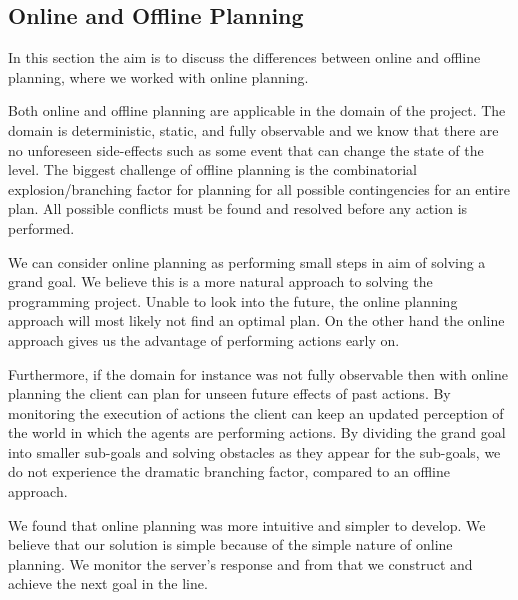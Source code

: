 \subsection{Online and Offline Planning}

In this section the aim is to discuss the differences between online and offline planning, where we worked with online planning.

Both online and offline planning are applicable in the domain of the project.
The domain is deterministic, static, and fully observable and we know that there are no unforeseen side-effects such as some event that can change the state of the level.
The biggest challenge of offline planning is the combinatorial explosion/branching factor for planning for all possible contingencies for an entire plan.
All possible conflicts must be found and resolved before any action is performed.

We can consider online planning as performing small steps in aim of solving a grand goal.
We believe this is a more natural approach to solving the programming project.
Unable to look into the future, the online planning approach will most likely not find an optimal plan.
On the other hand the online approach gives us the advantage of performing actions early on.

Furthermore, if the domain for instance was not fully observable then with online planning the client can plan for unseen future effects of past actions.
By monitoring the execution of actions the client can keep an updated perception of the world in which the agents are performing actions.
By dividing the grand goal into smaller sub-goals and solving obstacles as they appear for the sub-goals, we do not experience the dramatic branching factor, compared to an offline approach.

We found that online planning was more intuitive and simpler to develop.
We believe that our solution is simple because of the simple nature of online planning.
We monitor the server's response and from that we construct and achieve the next goal in the line.
